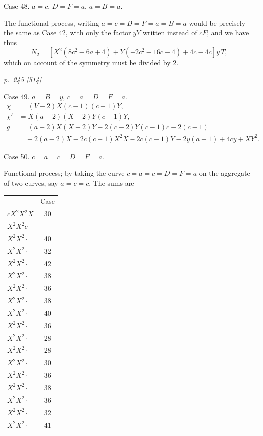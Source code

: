 \documentclass[11pt,a4paper]{book}
\begin{document}
Case 48.  $a = c$, $D = F = a$, $a = B = a$.

The functional process, writing $a = c = D = F = a = B = a$ would be precisely the same
as Case 42, with only the factor $yY$ written instead of $cF$; and we have thus
\[
N_2 = [X^2(8c^2 - 6a + 4) + Y(-2c^2 - 16c - 4) + 4c - 4c]
y \, T,
\]
which on account of the symmetry must be divided by 2.

\clearpage

\bigskip
\textit{p.~245 [514]}
\smallskip

Case 49.  $a = B = y$, $c = a = D = F = a$.
\begin{align*}
\chi &= (V - 2)X(c - 1)(c - 1)Y, \\
\chi' &= X(a - 2)(X - 2)Y(c - 1)Y, \\
g &= (a - 2)X(X - 2)Y - 2(c - 2)Y(c - 1)c - 2(c - 1) \\
&\quad - 2(a - 2)X - 2c(c - 1)X^2 X - 2c(c - 1)Y - 2y(a - 1) + 4cy + XY^2.
\end{align*}

Case 50.  $c = a = c = D = F = a$.

Functional process; by taking the curve $c = a = c = D = F = a$ on the aggregate of two
curves, say $a = c = c$.  The sums are

\begin{center}
\begin{tabular}{lc}
& Case \\
$cX^2 X^2 X$ & 30 \\
$X^2 X^2 c$ & --- \\
$X^2 X^2 \cdot$ & 40 \\
$X^2 X^2 \cdot$ & 32 \\
$X^2 X^2 \cdot$ & 42 \\
$X^2 X^2 \cdot$ & 38 \\
$X^2 X^2 \cdot$ & 36 \\
$X^2 X^2 \cdot$ & 38 \\
$X^2 X^2 \cdot$ & 40 \\
$X^2 X^2 \cdot$ & 36 \\
$X^2 X^2 \cdot$ & 28 \\
$X^2 X^2 \cdot$ & 28 \\
$X^2 X^2 \cdot$ & 30 \\
$X^2 X^2 \cdot$ & 36 \\
$X^2 X^2 \cdot$ & 38 \\
$X^2 X^2 \cdot$ & 36 \\
$X^2 X^2 \cdot$ & 32 \\
$X^2 X^2 \cdot$ & 41 \\
\end{tabular}
\end{center}
\end{document}

